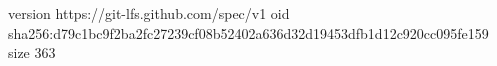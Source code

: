 version https://git-lfs.github.com/spec/v1
oid sha256:d79c1bc9f2ba2fc27239cf08b52402a636d32d19453dfb1d12c920cc095fe159
size 363
